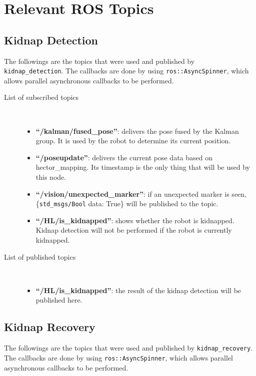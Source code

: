 \section{Relevant ROS Topics}\label{section:relevant_ros_topics}

\subsection{Kidnap Detection}
The followings are the topics that were used and published by \texttt{kidnap\_detection}. The callbacks are done by using \texttt{ros::AsyncSpinner}, which allows parallel asynchronous callbacks to be performed.


\begin{description}
\item[List of subscribed topics]\
	\begin{itemize}
	\item  \textbf{``/kalman/fused\_pose''}: delivers the pose fused by the Kalman group. It is used by the robot to determine its current position.
	\item  \textbf{``/poseupdate''}: delivers the current pose data based on hector\_mapping. Its timestamp is the only thing that will be used by this node.
	\item  \textbf{``/vision/unexpected\_marker''}: if an unexpected marker is seen, \{\texttt{std\_msgs/Bool} data: True\} will be published to the topic.
	\item  \textbf{``/HL/is\_kidnapped''}: shows whether the robot is kidnapped. Kidnap detection will not be performed if the robot is currently kidnapped.
	\end{itemize}
\end{description}

\begin{description}
\item[List of published topics]\
	\begin{itemize}
	\item \textbf{``/HL/is\_kidnapped''}: the result of the kidnap detection will be published here.
	\end{itemize}
\end{description}

\subsection{Kidnap Recovery}

The followings are the topics that were used and published by \texttt{kidnap\_recovery}. The callbacks are done by using \texttt{ros::AsyncSpinner}, which allows parallel asynchronous callbacks to be performed.

